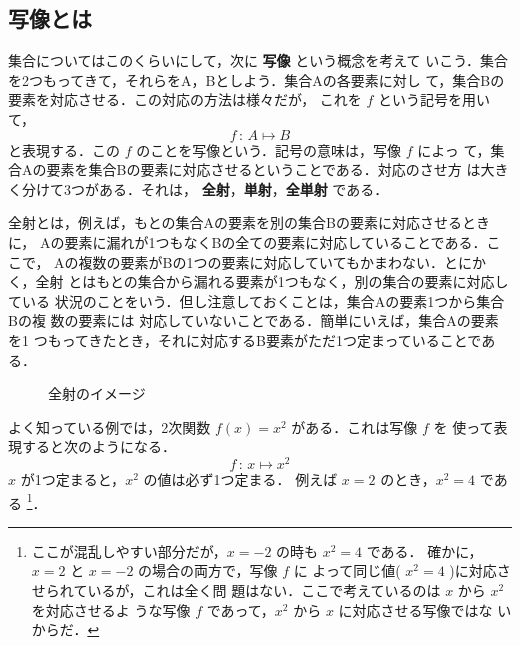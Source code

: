 ﻿%
\subsection{写像とは}
    集合についてはこのくらいにして，次に \textbf{写像} という概念を考えて
    いこう．集合を2つもってきて，それらをA，Bとしよう．集合Aの各要素に対し
    て，集合Bの要素を対応させる．この対応の方法は様々だが， これを $f$
     という記号を用いて，
        \begin{equation*}
            f\,:\,A \longmapsto  B
        \end{equation*}
    と表現する．この $f$ のことを写像という．記号の意味は，写像 $f$ によっ
    て，集合Aの要素を集合Bの要素に対応させるということである．対応のさせ方
    は大きく分けて3つがある．それは，
    \textbf{全射}，\textbf{単射}，\textbf{全単射} である．

    全射とは，例えば，もとの集合Aの要素を別の集合Bの要素に対応させるときに，
    Aの要素に漏れが1つもなくBの全ての要素に対応していることである．ここで，
    Aの複数の要素がBの1つの要素に対応していてもかまわない．とにかく，全射
    とはもとの集合から漏れる要素が1つもなく，別の集合の要素に対応している
    状況のことをいう．但し注意しておくことは，集合Aの要素1つから集合Bの複
    数の要素には    対応していないことである．簡単にいえば，集合Aの要素を1
    つもってきたとき，それに対応するB要素がただ1つ定まっていることである．

        \begin{figure}[hbt]
            \begin{center}
                \caption{全射のイメージ}
                \label{fig:zensha1}
            \end{center}
        \end{figure}

    よく知っている例では，2次関数 $f(x)=x^{2}$ がある．これは写像 $f$ を
    使って表現すると次のようになる．
        \begin{equation*}
            f\,:\,x \longmapsto  x^{2}
        \end{equation*}
    $x$ が1つ定まると，$x^{2}$ の値は必ず1つ定まる．
    例えば $x=2$ のとき，$x^{2}=4$ である
        \footnote{
            ここが混乱しやすい部分だが，$x=-2$ の時も $x^{2}=4$ である．
            確かに，$x=2$ と $x=-2$ の場合の両方で，写像 $f$ に
            よって同じ値( $x^{2}=4$ )に対応させられているが，これは全く問
            題はない．ここで考えているのは $x$ から $x^{2}$ を対応させるよ
            うな写像 $f$ であって，$x^{2}$ から $x$ に対応させる写像ではな
            いからだ．
        }．

